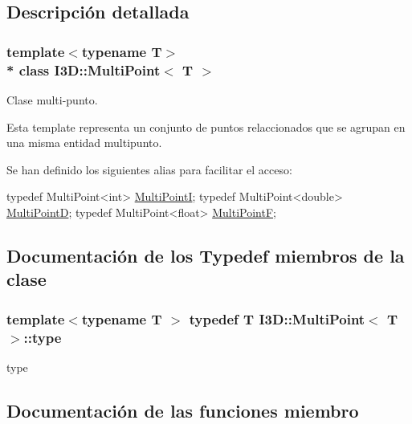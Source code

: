 \subsection{Descripción detallada}
\subsubsection*{template$<$typename T$>$\\*
class I3\+D\+::\+Multi\+Point$<$ T $>$}

Clase multi-\/punto. 

Esta template representa un conjunto de puntos relaccionados que se agrupan en una misma entidad multipunto.

Se han definido los siguientes alias para facilitar el acceso\+: 
\begin{DoxyCode}
\textcolor{keyword}{typedef} MultiPoint<int> \hyperlink{group___geometric_entities_gacd97741d89ded5ad4fbe71d32309e62b}{MultiPointI};
\textcolor{keyword}{typedef} MultiPoint<double> \hyperlink{group___geometric_entities_ga17d41c547edd7b9a916383723c0aeaec}{MultiPointD};
\textcolor{keyword}{typedef} MultiPoint<float> \hyperlink{group___geometric_entities_ga7e19d99de4e64c17e396f090e87d438b}{MultiPointF};
\end{DoxyCode}
 

\subsection{Documentación de los \textquotesingle{}Typedef\textquotesingle{} miembros de la clase}
\subsubsection[{\texorpdfstring{type}{type}}]{\setlength{\rightskip}{0pt plus 5cm}template$<$typename T $>$ typedef T {\bf I3\+D\+::\+Multi\+Point}$<$ T $>$\+::{\bf type}}\hypertarget{class_i3_d_1_1_multi_point_ae8bafa5f4c3f71c19b294e5495683582}{}\label{class_i3_d_1_1_multi_point_ae8bafa5f4c3f71c19b294e5495683582}


type 



\subsection{Documentación de las funciones miembro}
